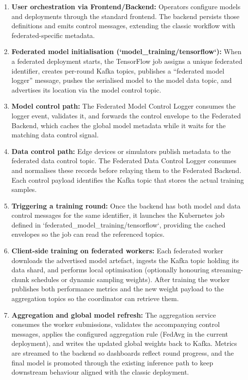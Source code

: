 \begin{enumerate}
    \item \textbf{User orchestration via Frontend/Backend:} Operators configure models and deployments through the standard frontend. The backend persists those definitions and emits control messages, extending the classic workflow with federated-specific metadata.

    \item \textbf{Federated model initialisation (`model\_training/tensorflow`):} When a federated deployment starts, the TensorFlow job assigns a unique federated identifier, creates per-round Kafka topics, publishes a ``federated model logger'' message, pushes the serialised model to the model data topic, and advertises its location via the model control topic.

    \item \textbf{Model control path:} The Federated Model Control Logger consumes the logger event, validates it, and forwards the control envelope to the Federated Backend, which caches the global model metadata while it waits for the matching data control signal.

    \item \textbf{Data control path:} Edge devices or simulators publish metadata to the federated data control topic. The Federated Data Control Logger consumes and normalises these records before relaying them to the Federated Backend. Each control payload identifies the Kafka topic that stores the actual training samples.

    \item \textbf{Triggering a training round:} Once the backend has both model and data control messages for the same identifier, it launches the Kubernetes job defined in `federated\_model\_training/tensorflow`, providing the cached envelopes so the job can read the referenced topics.

    \item \textbf{Client-side training on federated workers:} Each federated worker downloads the advertised model artefact, ingests the Kafka topic holding its data shard, and performs local optimisation (optionally honouring streaming-chunk schedules or dynamic sampling weights). After training the worker publishes both performance metrics and the new weight payload to the aggregation topics so the coordinator can retrieve them.

    \item \textbf{Aggregation and global model refresh:} The aggregation service consumes the worker submissions, validates the accompanying control messages, applies the configured aggregation rule (FedAvg in the current deployment), and writes the updated global weights back to Kafka. Metrics are streamed to the backend so dashboards reflect round progress, and the final model is promoted through the existing inference path to keep downstream behaviour aligned with the classic deployment.
\end{enumerate}

